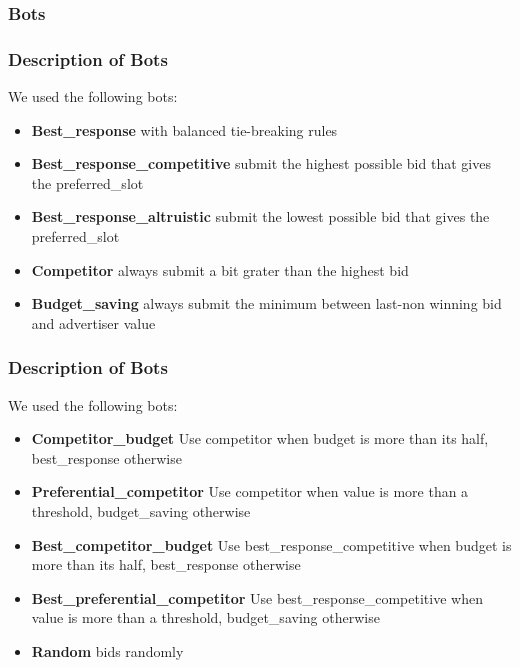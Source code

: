\documentclass{beamer}
\begin{document}
\subsubsection{Bots}
\begin{frame}
\frametitle{Description of Bots}
We used the following bots:
\begin{itemize}
\item \textbf{Best\_response} with balanced tie-breaking rules
\item \textbf{Best\_response\_competitive} submit the highest possible bid that gives the preferred\_slot
\item \textbf{Best\_response\_altruistic } submit the lowest possible bid that gives the preferred\_slot
\item \textbf{Competitor} always submit a bit grater than the highest bid
\item \textbf{Budget\_saving} always submit the minimum between last-non winning bid and advertiser value
\end{itemize}
\end{frame}

\begin{frame}
\frametitle{Description of Bots}
We used the following bots:
\begin{itemize}
\item \textbf{Competitor\_budget} Use competitor when budget is more than its half, best\_response otherwise  
\item \textbf{Preferential\_competitor} Use competitor when value is more than a threshold, budget\_saving otherwise
\item \textbf{Best\_competitor\_budget} Use best\_response\_competitive when budget is more than its half, best\_response otherwise
\item \textbf{Best\_preferential\_competitor} Use best\_response\_competitive when value is more than a threshold, budget\_saving otherwise
\item \textbf{Random} bids randomly
\end{itemize}
\end{frame}
\end{document}
